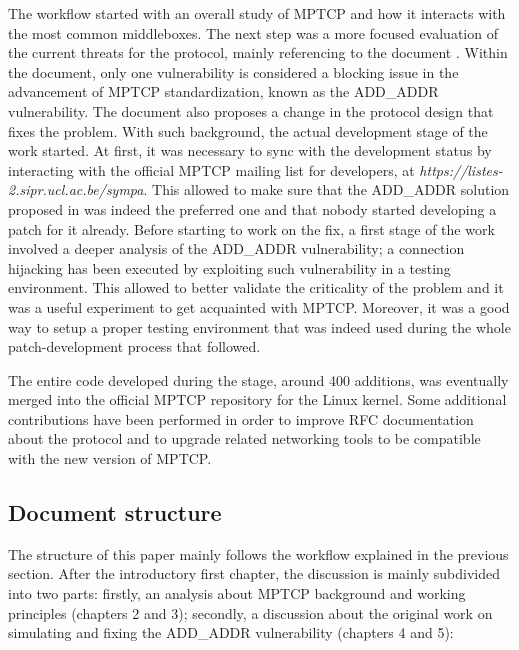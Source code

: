The workflow started with an overall study of MPTCP and how it interacts with the most common middleboxes. The next step was a more focused evaluation of the current threats for the protocol, mainly referencing to the document . Within the document, only one vulnerability is considered a blocking issue in the advancement of MPTCP standardization, known as the ADD\_ADDR vulnerability. The document also proposes a change in the protocol design that fixes the problem. With such background, the actual development stage of the work started. At first, it was necessary to sync with the development status by interacting with the official MPTCP mailing list for developers, at \textit{https://listes-2.sipr.ucl.ac.be/sympa}. This allowed to make sure that the ADD\_ADDR solution proposed in  was indeed the preferred one and that nobody started developing a patch for it already.
Before starting to work on the fix, a first stage of the work involved a deeper analysis of the ADD\_ADDR vulnerability; a connection hijacking has been executed by exploiting such vulnerability in a testing environment. This allowed to better validate the criticality of the problem and it was a useful experiment to get acquainted with MPTCP. Moreover, it was a good way to setup a proper testing environment that was indeed used during the whole patch-development process that followed.

The entire code developed during the stage, around 400 additions, was eventually merged into the official MPTCP repository for the Linux kernel. Some additional contributions have been performed in order to improve RFC documentation about the protocol and to upgrade related networking tools to be compatible with the new version of MPTCP.

\subsection{Document structure}
The structure of this paper mainly follows the workflow explained in the previous section. After the introductory first chapter, the discussion is mainly subdivided into two parts: firstly, an analysis about MPTCP background and working principles (chapters 2 and 3); secondly, a discussion about the original work on simulating and fixing the ADD\_ADDR vulnerability (chapters 4 and 5):

